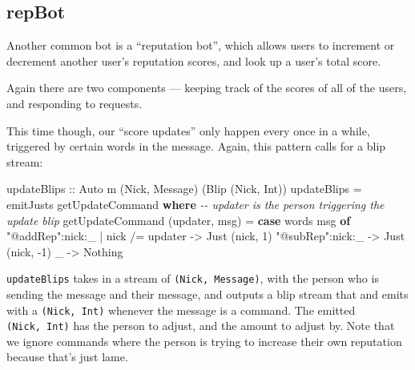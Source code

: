 \documentclass[]{article}
\newenvironment{Shaded}{}{}
\newcommand{\CommentTok}[1]{\textcolor[rgb]{0.38,0.63,0.69}{\textit{#1}}}
\newcommand{\DataTypeTok}[1]{\textcolor[rgb]{0.56,0.13,0.00}{#1}}
\newcommand{\DecValTok}[1]{\textcolor[rgb]{0.25,0.63,0.44}{#1}}
\newcommand{\FunctionTok}[1]{\textcolor[rgb]{0.02,0.16,0.49}{#1}}
\newcommand{\KeywordTok}[1]{\textcolor[rgb]{0.00,0.44,0.13}{\textbf{#1}}}
\newcommand{\NormalTok}[1]{#1}
\newcommand{\OperatorTok}[1]{\textcolor[rgb]{0.40,0.40,0.40}{#1}}
\newcommand{\OtherTok}[1]{\textcolor[rgb]{0.00,0.44,0.13}{#1}}
\newcommand{\StringTok}[1]{\textcolor[rgb]{0.25,0.44,0.63}{#1}}
\begin{document}
\subsection{repBot}\label{repbot}

Another common bot is a ``reputation bot'', which allows users to increment or
decrement another user's reputation scores, and look up a user's total score.

Again there are two components --- keeping track of the scores of all of the
users, and responding to requests.

This time though, our ``score updates'' only happen every once in a while,
triggered by certain words in the message. Again, this pattern calls for a blip
stream:

\begin{Shaded}
\begin{Highlighting}[]
\OtherTok{updateBlips ::} \DataTypeTok{Auto}\NormalTok{ m (}\DataTypeTok{Nick}\NormalTok{, }\DataTypeTok{Message}\NormalTok{) (}\DataTypeTok{Blip}\NormalTok{ (}\DataTypeTok{Nick}\NormalTok{, }\DataTypeTok{Int}\NormalTok{))}
\NormalTok{updateBlips }\OtherTok{=}\NormalTok{ emitJusts getUpdateCommand}
  \KeywordTok{where}
    \CommentTok{{-}{-} updater is the person triggering the update blip}
\NormalTok{    getUpdateCommand (updater, msg) }\OtherTok{=}
      \KeywordTok{case} \FunctionTok{words}\NormalTok{ msg }\KeywordTok{of}
        \StringTok{"@addRep"}\OperatorTok{:}\NormalTok{nick}\OperatorTok{:}\NormalTok{\_ }\OperatorTok{|}\NormalTok{ nick }\OperatorTok{/=}\NormalTok{ updater }\OtherTok{{-}\textgreater{}} \DataTypeTok{Just}\NormalTok{ (nick, }\DecValTok{1}\NormalTok{)}
        \StringTok{"@subRep"}\OperatorTok{:}\NormalTok{nick}\OperatorTok{:}\NormalTok{\_                   }\OtherTok{{-}\textgreater{}} \DataTypeTok{Just}\NormalTok{ (nick, }\OperatorTok{{-}}\DecValTok{1}\NormalTok{)}
\NormalTok{        \_                                  }\OtherTok{{-}\textgreater{}} \DataTypeTok{Nothing}
\end{Highlighting}
\end{Shaded}

\texttt{updateBlips} takes in a stream of \texttt{(Nick,\ Message)}, with the
person who is sending the message and their message, and outputs a blip stream
that and emits with a \texttt{(Nick,\ Int)} whenever the message is a command.
The emitted \texttt{(Nick,\ Int)} has the person to adjust, and the amount to
adjust by. Note that we ignore commands where the person is trying to increase
their own reputation because that's just lame.
\end{document}
